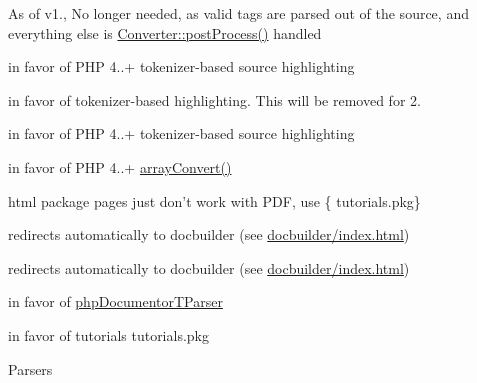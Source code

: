 
\begin{DoxyRefList}
\item[\label{deprecated__deprecated000003}%
\hypertarget{deprecated__deprecated000003}{}%
\-Global \hyperlink{_converter_8inc_ad6937ec0fb795ad86c6441bacb83bf2a}{adv\-\_\-htmlentities} (\$s)]\-As of v1., \-No longer needed, as valid tags are parsed out of the source, and everything else is \hyperlink{class_converter_a0b2058070d303b4d06535be248b021ab}{\-Converter\-::post\-Process()} handled  
\item[\label{deprecated__deprecated000005}%
\hypertarget{deprecated__deprecated000005}{}%
\-Global \hyperlink{class_c_h_mdefault_converter_ab36840588a8c62493031b9f23c4918c5}{\-C\-H\-Mdefault\-Converter} (\$sourcecode)]in favor of \-P\-H\-P 4..+ tokenizer-\/based source highlighting  
\item[\label{deprecated__deprecated000004}%
\hypertarget{deprecated__deprecated000004}{}%
\-Global \hyperlink{class_converter_ab36840588a8c62493031b9f23c4918c5}{\-Converter} (\$sourcecode)]in favor of tokenizer-\/based highlighting. \-This will be removed for 2.  
\item[\label{deprecated__deprecated000006}%
\hypertarget{deprecated__deprecated000006}{}%
\-Global \hyperlink{class_h_t_m_lframes_converter_ab36840588a8c62493031b9f23c4918c5}{\-H\-T\-M\-Lframes\-Converter} (\$sourcecode)]in favor of \-P\-H\-P 4..+ tokenizer-\/based source highlighting  
\item[\label{deprecated__deprecated000008}%
\hypertarget{deprecated__deprecated000008}{}%
\-Global \hyperlink{classparser_source_inline_tag_a529ef3472bff486827be8a9028d9ab96}{parser\-Source\-Inline\-Tag} (\&\$c)]in favor of \-P\-H\-P 4..+ \hyperlink{}{array\-Convert()}  
\item[\label{deprecated__deprecated000007}%
\hypertarget{deprecated__deprecated000007}{}%
\-Global \hyperlink{class_p_d_fdefault_converter_ab5f3dde79110c1809860e42205e9b787}{\-P\-D\-Fdefault\-Converter} (\&\$element)]html package pages just don't work with \-P\-D\-F, use \{ tutorials.\-pkg\}  
\item[\label{deprecated__deprecated000001}%
\hypertarget{deprecated__deprecated000001}{}%
\-Namespace \hyperlink{namespacephp_documentor}{php\-Documentor} ]redirects automatically to docbuilder (see \hyperlink{}{docbuilder/index.\-html}) 

redirects automatically to docbuilder (see \hyperlink{}{docbuilder/index.\-html}) 

in favor of \hyperlink{classphp_documentor_t_parser}{php\-Documentor\-T\-Parser} 

in favor of tutorials  tutorials.\-pkg

\-Parsers  
\item[\label{deprecated__deprecated000009}%
\hypertarget{deprecated__deprecated000009}{}%
\-Global \hyperlink{_parser_8inc_a839fb4fb9f4c0bfe8f0caad3230b91ee}{\-P\-H\-P\-D\-O\-C\-U\-M\-E\-N\-T\-O\-R\-\_\-\-E\-V\-E\-N\-T\-\_\-\-M\-E\-S\-S\-A\-G\-E} ]
\end{DoxyRefList}
